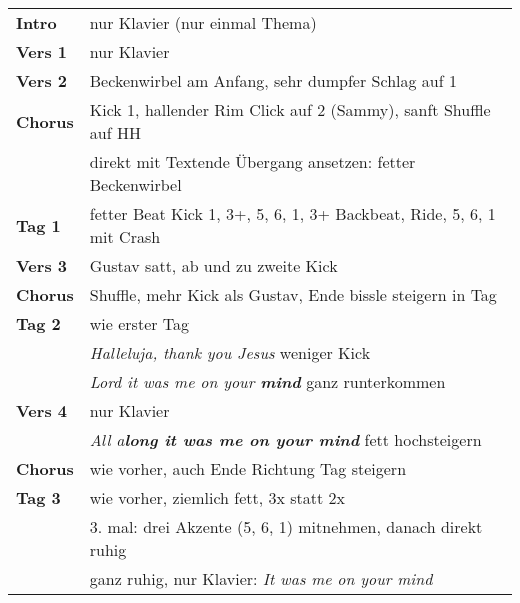 

\begin{tabular}{p{1.6cm}l}
	\textbf{Intro}  & nur Klavier (nur einmal Thema)                                              \\
	\textbf{Vers 1} & nur Klavier                                                                 \\
	\textbf{Vers 2} & Beckenwirbel am Anfang, sehr dumpfer Schlag auf 1                           \\
	\textbf{Chorus} & Kick 1, hallender Rim Click auf 2 (Sammy), sanft Shuffle auf HH             \\
	                & direkt mit Textende Übergang ansetzen: fetter Beckenwirbel                  \\
	\textbf{Tag 1}  & fetter Beat Kick 1, 3+, 5, 6, 1, 3+ Backbeat, Ride, 5, 6, 1 mit Crash \\
	\textbf{Vers 3} & Gustav satt, ab und zu zweite Kick                                          \\
	\textbf{Chorus} & Shuffle, mehr Kick als Gustav, Ende bissle steigern in Tag                  \\
	\textbf{Tag 2}  & wie erster Tag                                                              \\
	                & \textit{Halleluja, thank you Jesus} weniger Kick                            \\
	                & \textit{Lord it was me on your \textbf{mind}} ganz runterkommen             \\
	\textbf{Vers 4} & nur Klavier                                                                 \\
	                & \textit{All a\textbf{long it was me on your mind}} fett hochsteigern        \\
	\textbf{Chorus} & wie vorher, auch Ende Richtung Tag steigern                                 \\
	\textbf{Tag 3}  & wie vorher, ziemlich fett, 3x statt 2x                                      \\
	                & 3. mal: drei Akzente (5, 6, 1) mitnehmen, danach direkt ruhig               \\
	                & ganz ruhig, nur Klavier: \textit{It was me on your mind}                    \\
\end{tabular}
